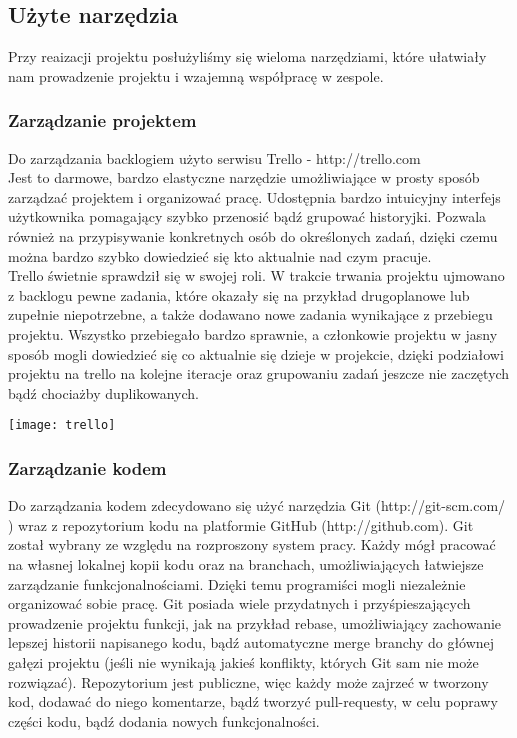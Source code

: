 \documentclass[polish,12pt]{aghthesis}
\begin{document}
\subsection{Użyte narzędzia}

Przy reaizacji projektu posłużyliśmy się wieloma narzędziami, które ułatwiały nam prowadzenie projektu i wzajemną współpracę w zespole.
\\

\subsubsection{Zarządzanie projektem}

Do zarządzania backlogiem użyto serwisu Trello - http://trello.com
\\

Jest to darmowe, bardzo elastyczne narzędzie umożliwiające w prosty sposób zarządzać projektem i organizować pracę. Udostępnia bardzo intuicyjny interfejs użytkownika pomagający szybko przenosić bądź grupować historyjki. Pozwala również na przypisywanie konkretnych osób do określonych zadań, dzięki czemu można bardzo szybko dowiedzieć się kto aktualnie nad czym pracuje.
\\

Trello świetnie sprawdził się w swojej roli. W trakcie trwania projektu ujmowano z backlogu pewne zadania, które okazały się na przykład drugoplanowe lub zupełnie niepotrzebne, a także dodawano nowe zadania wynikające z przebiegu projektu. Wszystko przebiegało bardzo sprawnie, a członkowie projektu w jasny sposób mogli dowiedzieć się co aktualnie się dzieje w projekcie, dzięki podziałowi projektu na trello na kolejne iteracje oraz grupowaniu zadań jeszcze nie zaczętych bądź chociażby duplikowanych. 

\texttt{[image: trello]}
\subsubsection{Zarządzanie kodem}

Do zarządzania kodem zdecydowano się użyć narzędzia Git (http://git-scm.com/ ) wraz z repozytorium kodu na platformie GitHub (http://github.com). Git został wybrany ze względu na rozproszony system pracy. Każdy mógł pracować na własnej lokalnej kopii kodu oraz na branchach, umożliwiających łatwiejsze zarządzanie funkcjonalnościami. Dzięki temu programiści mogli niezależnie organizować sobie pracę. Git posiada wiele przydatnych i przyśpieszających prowadzenie projektu funkcji, jak na przykład rebase, umożliwiający zachowanie lepszej historii napisanego kodu, bądź automatyczne merge branchy do głównej gałęzi projektu (jeśli nie wynikają jakieś konflikty, których Git sam nie może rozwiązać). Repozytorium jest publiczne, więc każdy może zajrzeć w tworzony kod, dodawać do niego komentarze, bądź tworzyć pull-requesty, w celu poprawy części kodu, bądź dodania nowych funkcjonalności. 
\end{document}
